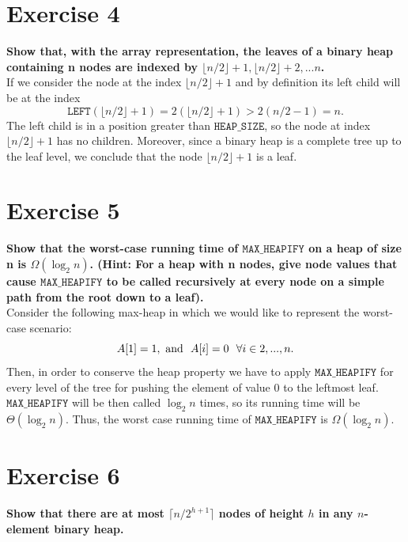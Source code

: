 \documentclass{article}
\begin{document}
	\section*{Exercise 4}
	\textbf{Show that, with the array representation, the leaves of a
	binary heap containing n nodes are indexed by $\lfloor n/2 \rfloor + 1, \lfloor n/2 \rfloor + 2, . . . n$.} \\



	\noindent If we consider the node at the index $ \lfloor n/2 \rfloor +1$ and by definition its left child will be at the index 
	$$ 
	\mathtt{LEFT}( \lfloor n/2 \rfloor +1 ) = 2(\lfloor n/2 \rfloor +1) > 2(n/2 - 1) = n.
	$$
	The left child is in a position greater than $\mathtt{HEAP\_SIZE}$, so the node at index $\lfloor n/2 \rfloor + 1$ has no children. Moreover, since a binary heap is a complete tree up to the leaf level, we conclude that the node $ \lfloor n/2 \rfloor +1$ is a leaf.
	
	\section*{Exercise 5}
	\textbf{Show that the worst-case running time of $\mathtt{MAX\_HEAPIFY}$ on a heap of size n is $\Omega(\log_2 n)$.  (Hint: For a heap with n nodes, give node values that cause $\mathtt{MAX\_HEAPIFY}$ to be called recursively at every node on a simple path from the root down to a leaf).} \\
	
	\noindent Consider the following max-heap in which we would like to represent the worst-case scenario:
	$$
	A[1] = 1, ~ \textmd{and} ~~ A[i] = 0 ~~ \forall i \in {2,..., n}.
	$$
	Then, in order to conserve the heap property we have to apply $\mathtt{MAX\_HEAPIFY}$ for every level of the tree  for pushing the element of value 0 to the leftmost leaf. $\mathtt{MAX\_HEAPIFY}$ will be then called $\log_2n$ times, so its running time will be $\Theta (\log_2n)$. Thus, the worst case running time of $\mathtt{MAX\_HEAPIFY}$ is $\Omega(\log_2n)$.
	
	\section*{Exercise 6}
	\textbf{Show that there are at most $\lceil n/2^{h+1} \rceil$ nodes of height $h$ in any $n$-element binary heap.} \\
	
\end{document}
